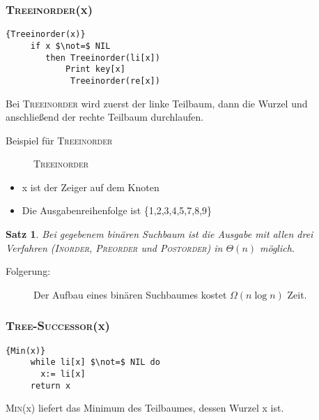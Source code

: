 \documentclass[ngerman,draft,parskip=half*,twoside]{scrreprt}
\theoremstyle{break}
\newtheorem{satz}{Satz}
\begin{document}
 \subsubsection{\textsc{Treeinorder}(x)}
   \begin{Algorithmus}[H]	
\begin{lstlisting}[frame=tlrb, mathescape=true, title=\textsc{Treeinorder\textnormal{(x)}}, gobble=4]{Treeinorder(x)}
     if x $\not=$ NIL
        then Treeinorder(li[x])
        	Print key[x]
             Treeinorder(re[x])
\end{lstlisting}

    Bei \textsc{Treeinorder} wird zuerst der linke Teilbaum, dann die 
    Wurzel und anschließend der rechte Teilbaum durchlaufen.
\end{Algorithmus}

  Beispiel für \textsc{Treeinorder}
  \begin{figure}[H]
  \centering  
   \caption{\textsc{Treeinorder}}
   \label{171103d}
  \end{figure}
 \begin{itemize}
  \item x ist der Zeiger auf dem Knoten
  \item Die Ausgabenreihenfolge ist \{1,2,3,4,5,7,8,9\}
 \end{itemize}
 
  \begin{satz}
 Bei gegebenem binären Suchbaum ist die Ausgabe mit allen drei Verfahren (\textsc{Inorder}, 
 \textsc{Preorder} und \textsc{Postorder}) in $\Theta( n )$ möglich.
 \end{satz}
 \begin{description}
  \item[Folgerung:] Der Aufbau eines binären Suchbaumes kostet $\Omega( n \log n )$ Zeit.
 \end{description}
 
 \subsubsection{\textsc{Tree-Successor}(x)}
 
   \begin{Algorithmus}[H]
    \begin{lstlisting}[frame=tlrb, mathescape=true, title=\textsc{Min\textnormal{(x)}}, gobble=4]{Min(x)}
     while li[x] $\not=$ NIL do
       x:= li[x]
     return x
    \end{lstlisting}

   \textsc{Min}(x) liefert das Minimum des Teilbaumes, dessen Wurzel x ist.
   \end{Algorithmus}
   
\end{document}
